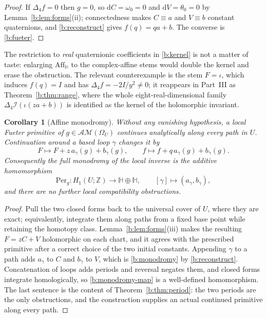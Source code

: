 \documentclass[11pt,a4paper]{article}
\numberwithin{equation}{section}
\newtheorem{corollary}[theorem]{Corollary}
\theoremstyle{definition}
\theoremstyle{remark}
\theoremstyle{plain}
\newcommand{\HH}{\mathbb H}
\newcommand{\ZZ}{\mathbb Z}
\newcommand{\lap}{\Delta_4}
\newcommand{\I}{\mathcal I}
\newcommand{\AM}{\mathcal{AM}}
\newcommand{\Om}{\Omega}
\newcommand{\Aff}{\mathrm{Aff}_{\HH}}
\newcommand{\om}{\omega}
\newcommand{\thet}{\theta}
\newcommand{\Per}{\mathrm{Per}}
\newcommand{\pot}{C}          %
\newcommand{\potV}{V}         %
\newcommand{\dd}{\mathrm d}
\begin{document}
\begin{proof}
If $\lap f=0$ then $g=0$, so $\dd\pot=\om_0=0$ and $\dd\potV=\thet_0=0$ by
Lemma~\ref{b:lem:forms}(ii); connectedness makes $\pot\equiv a$ and
$\potV\equiv b$ constant quaternions, and \eqref{b:reconstruct} gives
$f(q)=qa+b$.  The converse is \eqref{b:fueter}.
\end{proof}

The restriction to \emph{real} quaternionic coefficients in \eqref{b:kernel}
is not a matter of taste: enlarging $\Aff$ to the complex-affine stems would
double the kernel and erase the obstruction.  The relevant counterexample is
the stem $F=\iota$, which induces $f(q)=I$ and has
$\lap f=-2I/y^2\neq0$; it reappears in Part~III as
Theorem~\ref{b:thm:range}, where the whole eight-real-dimensional family
$\lap\I(\iota(za+b))$ is identified as the kernel of the holomorphic
invariant.

\begin{corollary}[Affine monodromy]
\label{b:cor:monodromy}
Without any vanishing hypothesis, a local Fueter primitive of
$g\in\AM(\Om_U)$ continues analytically along every path in $U$.  Continuation
around a based loop $\gamma$ changes it by
\begin{equation}
 F\longmapsto F+z\,a_\gamma(g)+b_\gamma(g),
 \qquad
 f\longmapsto f+q\,a_\gamma(g)+b_\gamma(g).
 \label{b:monodromy}
\end{equation}
Consequently the full monodromy of the local inverse is the additive
homomorphism
\begin{equation}
 \Per_g:H_1(U;\ZZ)\longrightarrow\HH\oplus\HH,
 \qquad [\gamma]\longmapsto(a_\gamma,b_\gamma),
 \label{b:monodromy-map}
\end{equation}
and there are no further local compatibility obstructions.
\end{corollary}

\begin{proof}
Pull the two closed forms back to the universal cover of $U$, where they are
exact; equivalently, integrate them along paths from a fixed base point while
retaining the homotopy class.  Lemma~\ref{b:lem:forms}(iii) makes the
resulting $F=z\pot+\potV$ holomorphic on each chart, and it agrees with the
prescribed primitive after a correct choice of the two initial constants.
Appending $\gamma$ to a path adds $a_\gamma$ to $\pot$ and $b_\gamma$ to
$\potV$, which is \eqref{b:monodromy} by \eqref{b:reconstruct}.
Concatenation of loops adds periods and reversal negates them, and closed
forms integrate homologically, so \eqref{b:monodromy-map} is a well-defined
homomorphism.  The last sentence is the content of
Theorem~\ref{b:thm:period}: the two periods are the only obstructions, and
the construction supplies an actual continued primitive along every path.
\end{proof}
\end{document}
